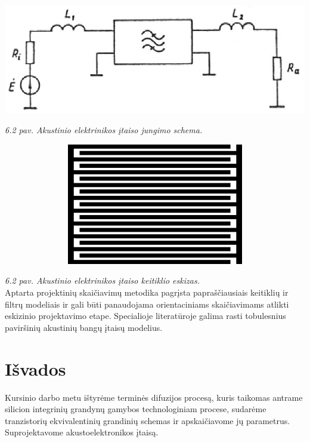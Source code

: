 \documentclass[11pt,a4paper]{article}
\begin{document}
\begin{center}
\includegraphics[width=400pt]{jungimo_schema.png}
\end{center}
\textsl{6.2 pav. Akustinio elektrinikos įtaiso jungimo schema.}\\

\begin{center}
\includegraphics[width=400pt,height=150pt]{keitiklio_eskizas.png}
\end{center}
\textsl{6.2 pav. Akustinio elektrinikos įtaiso keitiklio eskizas.}\\

Aptarta projektinių skaičiavimų metodika pagrįsta papraščiausiais keitiklių ir filtrų modeliais ir gali būti panaudojama 
orientaciniams skaičiavimams atlikti eskizinio projektavimo etape. Specialioje literatūroje galima rasti tobulesnius paviršinių 
akustinių bangų įtaisų modelius.

\section{Išvados}

Kursinio darbo metu ištyrėme terminės difuzijos procesą, kuris taikomas antrame silicion integrinių grandynų 
gamybos technologiniam procese, sudarėme tranzistorių ekvivalentinių grandinių schemas ir apskaičiavome jų parametrus. 
Suprojektavome akustoelektronikos įtaisą.\\
\end{document}
